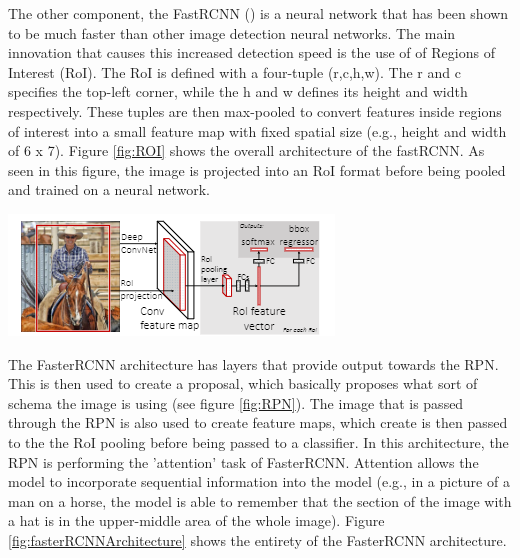 \documentclass[man]{apa7}
\begin{document}
\newpage

The other component, the FastRCNN (\textcite{fastRCNN}) is a neural network that has been shown to be much faster than other image detection neural networks. The main innovation that causes this increased detection speed is the use of of Regions of Interest (RoI). The RoI is defined with a four-tuple (r,c,h,w). The r and c specifies the top-left corner, while the h and w defines its height and width respectively. These tuples are then max-pooled to convert features inside regions of interest into a small feature map with fixed spatial size (e.g., height and width of 6 x 7). Figure \ref{fig:ROI} shows the overall architecture of the fastRCNN. As seen in this figure, the image is projected into an RoI format before being pooled and trained on a neural network.

\begin{minipage}{\linewidth}
  \includegraphics[]{figures/ROI.png}
  \label{fig:ROI}
\end{minipage}

The FasterRCNN architecture has layers that provide output towards the RPN. This is then used to create a proposal, which basically proposes what sort of schema the image is using (see figure \ref{fig:RPN}). The image that is passed through the RPN is also used to create feature maps, which create is then passed to the the RoI pooling before being passed to a classifier. In this architecture, the RPN is performing the 'attention' task of FasterRCNN. Attention allows the model to incorporate sequential information into the model (e.g., in a picture of a man on a horse, the model is able to remember that the section of the image with a hat is in the upper-middle area of the whole image). Figure \ref{fig:fasterRCNNArchitecture} shows the entirety of the FasterRCNN architecture.

\newpage
\end{document}
